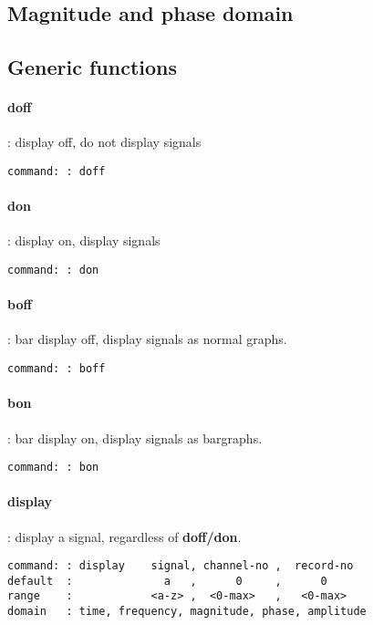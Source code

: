 \documentclass{report}
\newcommand{\bc}{\scriptsize}
\newcommand{\ec}{\normalsize}
\begin{document}
\subsection{Magnitude and phase domain}

\subsection{Generic functions}

\paragraph{doff}: display off, do not display signals

\bc
\begin{verbatim}
command: : doff
\end{verbatim}
\ec

\paragraph{don}: display on, display signals

\bc
\begin{verbatim}
command: : don
\end{verbatim}
\ec

\paragraph{boff}: bar display off, display signals as normal graphs.

\bc
\begin{verbatim}
command: : boff
\end{verbatim}
\ec

\paragraph{bon}: bar display on, display signals as bargraphs.

\bc
\begin{verbatim}
command: : bon
\end{verbatim}
\ec

\paragraph{display}: display a signal, regardless of \textbf{doff/don}.

\bc
\begin{verbatim}
command: : display    signal, channel-no ,  record-no
default  :              a   ,      0     ,      0
range    :            <a-z> ,  <0-max>   ,   <0-max>
domain   : time, frequency, magnitude, phase, amplitude
\end{verbatim}
\ec
\end{document}
